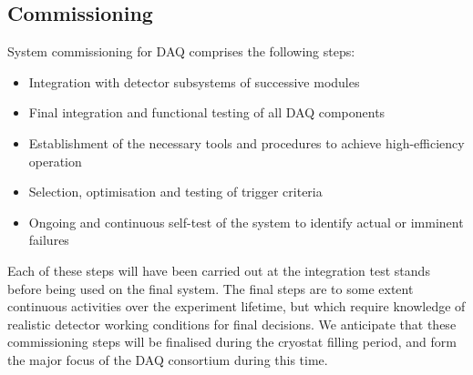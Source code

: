 \subsection{Commissioning}
\label{sec:fdsp-daq-commissioning}

System commissioning for DAQ comprises the following steps:

\begin{itemize}
	\item Integration with detector subsystems of successive modules
	\item Final integration and functional testing of all DAQ components
	\item Establishment of the necessary tools and procedures to achieve high-efficiency operation
	\item Selection, optimisation and testing of trigger criteria
	\item Ongoing and continuous self-test of the system to identify actual or imminent failures
\end{itemize}

Each of these steps will have been carried out at the integration test stands before being used on the final system. The final steps are to some extent continuous activities over the experiment lifetime, but which require knowledge of realistic detector working conditions for final decisions. We anticipate that these commissioning steps will be finalised during the cryostat filling period, and form the major focus of the DAQ consortium during this time.
